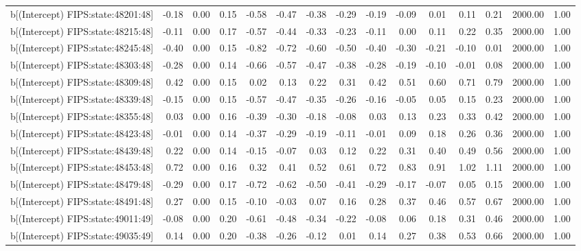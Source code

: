 \begin{table}[ht]
\begin{tabular}{rrrrrrrrrrrrrrr}
  b[(Intercept) FIPS:state:48201:48] & -0.18 & 0.00 & 0.15 & -0.58 & -0.47 & -0.38 & -0.29 & -0.19 & -0.09 & 0.01 & 0.11 & 0.21 & 2000.00 & 1.00 \\ 
  b[(Intercept) FIPS:state:48215:48] & -0.11 & 0.00 & 0.17 & -0.57 & -0.44 & -0.33 & -0.23 & -0.11 & 0.00 & 0.11 & 0.22 & 0.35 & 2000.00 & 1.00 \\ 
  b[(Intercept) FIPS:state:48245:48] & -0.40 & 0.00 & 0.15 & -0.82 & -0.72 & -0.60 & -0.50 & -0.40 & -0.30 & -0.21 & -0.10 & 0.01 & 2000.00 & 1.00 \\ 
  b[(Intercept) FIPS:state:48303:48] & -0.28 & 0.00 & 0.14 & -0.66 & -0.57 & -0.47 & -0.38 & -0.28 & -0.19 & -0.10 & -0.01 & 0.08 & 2000.00 & 1.00 \\ 
  b[(Intercept) FIPS:state:48309:48] & 0.42 & 0.00 & 0.15 & 0.02 & 0.13 & 0.22 & 0.31 & 0.42 & 0.51 & 0.60 & 0.71 & 0.79 & 2000.00 & 1.00 \\ 
  b[(Intercept) FIPS:state:48339:48] & -0.15 & 0.00 & 0.15 & -0.57 & -0.47 & -0.35 & -0.26 & -0.16 & -0.05 & 0.05 & 0.15 & 0.23 & 2000.00 & 1.00 \\ 
  b[(Intercept) FIPS:state:48355:48] & 0.03 & 0.00 & 0.16 & -0.39 & -0.30 & -0.18 & -0.08 & 0.03 & 0.13 & 0.23 & 0.33 & 0.42 & 2000.00 & 1.00 \\ 
  b[(Intercept) FIPS:state:48423:48] & -0.01 & 0.00 & 0.14 & -0.37 & -0.29 & -0.19 & -0.11 & -0.01 & 0.09 & 0.18 & 0.26 & 0.36 & 2000.00 & 1.00 \\ 
  b[(Intercept) FIPS:state:48439:48] & 0.22 & 0.00 & 0.14 & -0.15 & -0.07 & 0.03 & 0.12 & 0.22 & 0.31 & 0.40 & 0.49 & 0.56 & 2000.00 & 1.00 \\ 
  b[(Intercept) FIPS:state:48453:48] & 0.72 & 0.00 & 0.16 & 0.32 & 0.41 & 0.52 & 0.61 & 0.72 & 0.83 & 0.91 & 1.02 & 1.11 & 2000.00 & 1.00 \\ 
  b[(Intercept) FIPS:state:48479:48] & -0.29 & 0.00 & 0.17 & -0.72 & -0.62 & -0.50 & -0.41 & -0.29 & -0.17 & -0.07 & 0.05 & 0.15 & 2000.00 & 1.00 \\ 
  b[(Intercept) FIPS:state:48491:48] & 0.27 & 0.00 & 0.15 & -0.10 & -0.03 & 0.07 & 0.16 & 0.28 & 0.37 & 0.46 & 0.57 & 0.67 & 2000.00 & 1.00 \\ 
  b[(Intercept) FIPS:state:49011:49] & -0.08 & 0.00 & 0.20 & -0.61 & -0.48 & -0.34 & -0.22 & -0.08 & 0.06 & 0.18 & 0.31 & 0.46 & 2000.00 & 1.00 \\ 
  b[(Intercept) FIPS:state:49035:49] & 0.14 & 0.00 & 0.20 & -0.38 & -0.26 & -0.12 & 0.01 & 0.14 & 0.27 & 0.38 & 0.53 & 0.66 & 2000.00 & 1.00 \\ 

\end{tabular}
\end{table}
